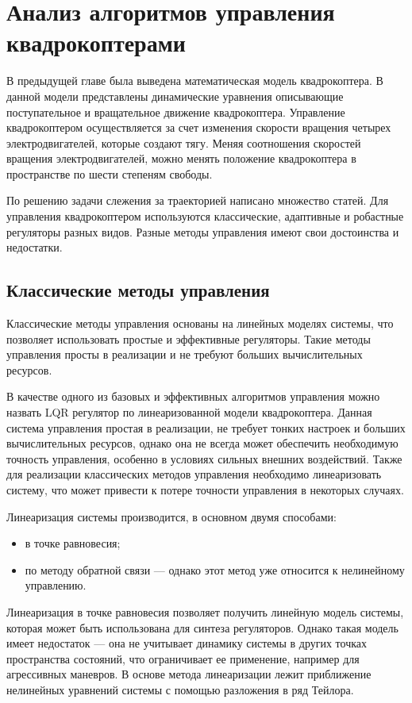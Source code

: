\chapter{Анализ алгоритмов управления квадрокоптерами}
\label{ch:chap1}

В предыдущей главе была выведена математическая модель квадрокоптера. 
В данной модели представлены 
динамические уравнения описывающие поступательное и вращательное движение квадрокоптера.  
Управление квадрокоптером осуществляется за счет изменения скорости 
вращения четырех электродвигателей, которые создают тягу. 
Меняя соотношения скоростей
вращения электродвигателей, можно менять положение квадрокоптера в 
пространстве по шести степеням свободы. 

По решению задачи слежения за траекторией написано множество статей. Для управления квадрокоптером
используются классические, адаптивные и робастные регуляторы разных видов. Разные методы управления имеют свои достоинства 
и недостатки. 

\section{Классические методы управления}

Классические методы управления основаны на линейных моделях системы, что позволяет использовать
простые и эффективные регуляторы. Такие методы управления просты в реализации 
и не требуют больших вычислительных ресурсов. 


В качестве одного из базовых и эффективных алгоритмов управления можно назвать LQR регулятор по линеаризованной модели квадрокоптера.
Данная система управления простая в реализации, не требует тонких настроек и больших вычислительных ресурсов, однако
она не всегда может обеспечить необходимую точность управления, особенно в условиях сильных внешних воздействий. Также для реализации
классических методов управления необходимо линеаризовать систему, что может привести к потере точности управления в некоторых случаях.

Линеаризация системы производится, в основном двумя способами:
\begin{itemize}
    \item в точке равновесия;
    \item по методу обратной связи --- однако этот метод уже относится к нелинейному управлению.
\end{itemize}

Линеаризация в точке равновесия позволяет получить линейную модель системы, которая может быть использована для синтеза регуляторов.
Однако такая модель имеет недостаток — она не учитывает динамику системы в других точках пространства состояний, 
что ограничивает ее применение, например для агрессивных маневров. В основе метода линеаризации лежит приближение 
нелинейных уравнений системы с помощью разложения в ряд Тейлора.


